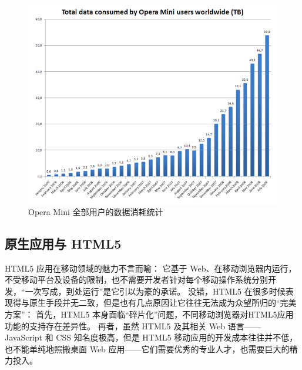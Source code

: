 \begin{figure}[h!]
    \centering
    \includegraphics[width=400pt]{figure/Total_data_consumed_by_Opera_Mini_users_worldwide_(TB).png}
    \caption{Opera Mini 全部用户的数据消耗统计}
    \label{opera-mini-total-data}
\end{figure}

\subsection{原生应用与 HTML5}

HTML5 应用在移动领域的魅力不言而喻：
它基于 Web、在移动浏览器内运行，不受移动平台及设备的限制，也不需要开发者针对每个移动操作系统分别开发，“一次写成，到处运行”是它引以为豪的承诺。
没错，HTML5 在很多时候表现得与原生手段并无二致，但是也有几点原因让它往往无法成为众望所归的“完美方案”：
首先，HTML5 本身面临“碎片化”问题，不同移动浏览器对HTML5应用功能的支持存在差异性。
再者，虽然 HTML5 及其相关 Web 语言—— JavaScript 和 CSS 知名度极高，但是 HTML5 移动应用的开发成本往往并不低，也不能单纯地照搬桌面 Web 应用——它们需要优秀的专业人才，也需要巨大的精力投入。

